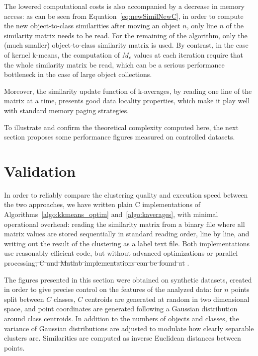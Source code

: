 \documentclass[natbib,smallextended]{svjour3}
\providecommand{\DIFdeltex}[1]{{\protect\color{red}\sout{#1}}}                      %
\providecommand{\DIFdelbegin}{} %
\providecommand{\DIFdelend}{} %
\providecommand{\DIFdel}[1]{\texorpdfstring{\DIFdeltex{#1}}{}} %
\begin{document}
The lowered computational costs is also accompanied by a decrease in memory access: as can be seen from Equation~\ref{eq:newSimilNewC}, in order to compute the new object-to-class similarities after moving an object $n$, only line $n$ of the similarity matrix needs to be read. For the remaining of the algorithm, only the (much smaller) object-to-class similarity matrix is used. By contrast, in the case of kernel k-means, the computation of $M_c$ values at each iteration require that the whole similarity matrix be read, which can be a serious performance bottleneck in the case of large object collections.

Moreover, the similarity update function of k-averages, by reading one line of the matrix at a time, presents good data locality properties, which make it play well with standard memory paging strategies.

To illustrate and confirm the theoretical complexity computed here, the next section proposes some performance figures measured on controlled datasets.

\section{Validation}
\label{sec:validation}

In order to reliably compare the clustering quality and execution speed between the two approaches, we have written plain C implementations of Algorithms~\ref{algo:kkmeans_optim} and~\ref{algo:kaverages}, with minimal operational overhead: reading the similarity matrix from a binary file where all matrix values are stored sequentially in standard reading order, line by line, and writing out the result of the clustering as a label text file. Both implementations use reasonably efficient code, but without advanced optimizations or parallel processing\DIFdelbegin \DIFdel{; C and Matlab implementations can be found at}%
\DIFdelend .	%

The figures presented in this section were obtained on synthetic datasets, created in order to give precise control on the features of the analyzed data: for $n$ points split between $C$ classes, $C$ centroids are generated at random in two dimensional space, and point coordinates are generated following a Gaussian distribution around class centroids. In addition to the numbers of objects and classes, the variance of Gaussian distributions are adjusted to modulate how clearly separable clusters are. Similarities are computed as inverse Euclidean distances between points. %
\end{document}
